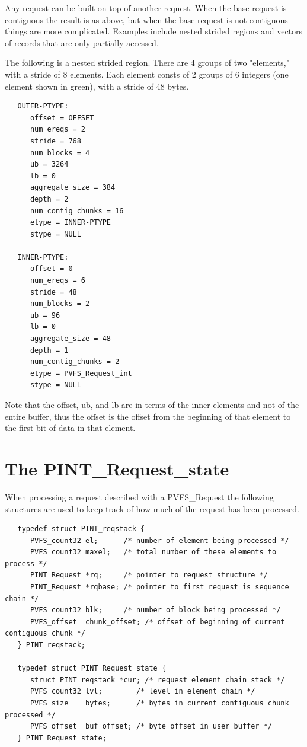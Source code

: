 \documentclass[12pt]{article} %
\begin{document}
Any request can be built on top of another request.  When the base
request is
contiguous the result is as above, but when the base request is not
contiguous things are more complicated.  Examples include nested
strided regions and vectors of records that are only partially
accessed.

The following is a nested strided region.  There are 4 groups of
two "elements," with a stride of 8 elements.  Each element consts
of 2 groups of 6 integers (one element shown in green), with a stride
of 48 bytes.

\begin{verbatim}
   OUTER-PTYPE:
      offset = OFFSET
      num_ereqs = 2
      stride = 768
      num_blocks = 4
      ub = 3264
      lb = 0
      aggregate_size = 384
      depth = 2
      num_contig_chunks = 16
      etype = INNER-PTYPE
      stype = NULL

   INNER-PTYPE:
      offset = 0
      num_ereqs = 6
      stride = 48
      num_blocks = 2
      ub = 96
      lb = 0
      aggregate_size = 48
      depth = 1
      num_contig_chunks = 2
      etype = PVFS_Request_int
      stype = NULL
\end{verbatim}

Note that the offset, ub, and lb are in terms of the inner elements
and not of the entire buffer, thus the offset is the offset from the
beginning of that element to the first bit of data in that element.

\section{The PINT\_Request\_state}

When processing a request described with a PVFS\_Request the following
structures are used to keep track of how much of the request has been
processed.

\begin{verbatim}
   typedef struct PINT_reqstack {
      PVFS_count32 el;      /* number of element being processed */
      PVFS_count32 maxel;   /* total number of these elements to process */
      PINT_Request *rq;     /* pointer to request structure */
      PINT_Request *rqbase; /* pointer to first request is sequence chain */
      PVFS_count32 blk;     /* number of block being processed */
      PVFS_offset  chunk_offset; /* offset of beginning of current contiguous chunk */
   } PINT_reqstack;

   typedef struct PINT_Request_state {
      struct PINT_reqstack *cur; /* request element chain stack */
      PVFS_count32 lvl;        /* level in element chain */
      PVFS_size    bytes;      /* bytes in current contiguous chunk processed */
      PVFS_offset  buf_offset; /* byte offset in user buffer */
   } PINT_Request_state;
\end{verbatim}
\end{document}
